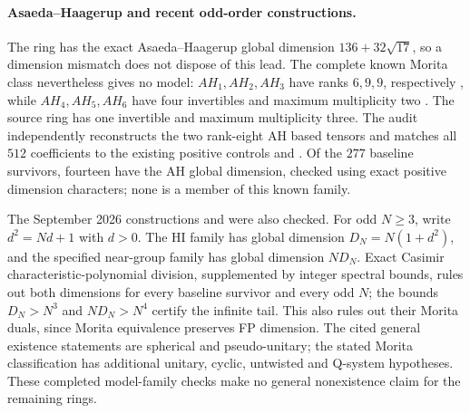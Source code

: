 \paragraph{Asaeda--Haagerup and recent odd-order constructions.}
The ring  has the exact Asaeda--Haagerup global dimension
\(136+32\sqrt{17}\), so a dimension mismatch does not dispose of this
lead.  The complete known Morita class nevertheless gives no model:
\(AH_1,AH_2,AH_3\) have ranks \(6,9,9\), respectively
\cite[Section~4.3, Tables~1--3]{GSAsaedaMorita}, while
\(AH_4,AH_5,AH_6\) have four invertibles and maximum multiplicity two
\cite[Lemmas~3.4, 3.7, 3.15 and Theorem~4.21]{AH}.
The source ring has one invertible and maximum multiplicity three.
The audit independently reconstructs the two rank-eight AH based
tensors and matches all \(512\) coefficients to the existing positive
controls  and .  Of the \(277\) baseline
survivors, fourteen have the AH global dimension, checked using exact
positive dimension characters; none is a member of this known family.

The September 2026 constructions
\cite[Theorem~2.1]{HuangOddHI2026} and
\cite[Theorems~A, 4.4 and 6.3]{GSYOddHI2026} were also checked.
For odd \(N\geq3\), write \(d^2=Nd+1\) with \(d>0\).
The HI family has global dimension \(D_N=N(1+d^2)\), and the specified
near-group family has global dimension \(ND_N\).
Exact Casimir characteristic-polynomial division, supplemented by
integer spectral bounds, rules out both dimensions for every baseline
survivor and every odd \(N\); the bounds \(D_N>N^3\) and
\(ND_N>N^4\) certify the infinite tail.  This also rules out their
Morita duals, since Morita equivalence preserves FP dimension.
The cited general existence statements are spherical and pseudo-unitary;
the stated Morita classification has additional unitary, cyclic,
untwisted and Q-system hypotheses.  These completed model-family
checks make no general nonexistence claim for the remaining rings.
